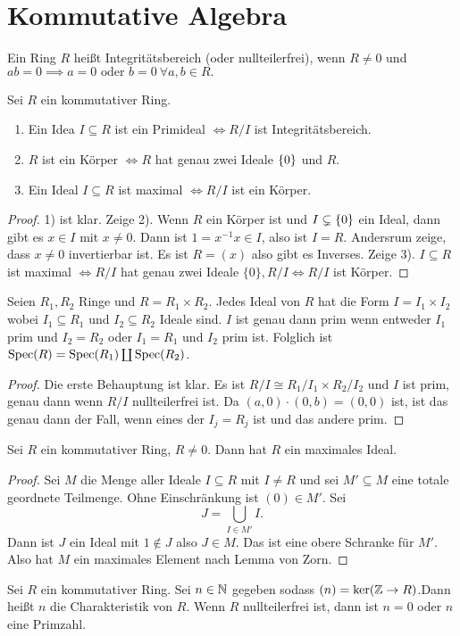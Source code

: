\section{Kommutative Algebra}

\begin{Def}
    Ein Ring $R$ heißt Integritätsbereich (oder nullteilerfrei), wenn $R\neq 0$ und $ab=0\implies a=0 \text{ oder } b=0 \ \forall a,b\in R.$
\end{Def}
\begin{Lemma} Sei $R$ ein kommutativer Ring.
\begin{enumerate}
    \item Ein Idea $I\subseteq R$ ist ein Primideal $\iff R/I$ ist Integritätsbereich.
    \item $R$ ist ein Körper $\iff R$ hat genau zwei Ideale $\{0\}$ und $R$.
    \item Ein Ideal $I\subseteq R$ ist maximal $\iff R/I$ ist ein Körper.
\end{enumerate}
\begin{proof}
    1) ist klar.
    Zeige 2). Wenn $R$ ein Körper ist und $I\subsetneq \{0\}$ ein Ideal, dann gibt es $x\in I$ mit $x\neq 0$. Dann ist $1=x^{-1}x\in I$, also ist $I=R$. Andersrum zeige, dass $x\neq 0$ invertierbar ist. Es ist $R=(x)$ also gibt es Inverses.
    Zeige 3). $I\subseteq R$ ist maximal $\iff R/I$ hat genau zwei Ideale $\{0\}, R/I \iff R/I$ ist Körper.
\end{proof}
\begin{Lemma}
    Seien $R_1,R_2$ Ringe und $R=R_1\times R_2$. Jedes Ideal von $R$ hat die Form $I=I_1\times I_2$ wobei $I_1\subseteq R_1$ und $I_2\subseteq R_2$ Ideale sind. $I$ ist genau dann prim wenn entweder $I_1$ prim und $I_2=R_2$ oder $I_1=R_1$ und $I_2$ prim ist.
    Folglich ist $\operatorname{Spec}(R)=\operatorname{Spec}(R_1)\coprod \operatorname{Spec}(R_2)$.
\end{Lemma}
\begin{proof}
    Die erste Behauptung ist klar. Es ist $R/I\cong R_1/I_1\times R_2/I_2$ und $I$ ist prim, genau dann wenn $R/I$ nullteilerfrei ist.
    Da $(a,0)\cdot (0,b)=(0,0)$ ist, ist das genau dann der Fall, wenn eines der $I_j=R_j$ ist und das andere prim.
\end{proof}

\begin{Satz}\label{Satz:ExMaxId}
    Sei $R$ ein kommutativer Ring, $R\neq 0$. Dann hat $R$ ein maximales Ideal.
\end{Satz}
\begin{proof}
    Sei $M$ die Menge aller Ideale $I\subseteq R$ mit $I\neq R$ und sei $M'\subseteq M$ eine totale geordnete Teilmenge.  Ohne Einschränkung ist $(0)\in M'$. Sei $$J=\bigcup\limits_{I\in M'}I.$$ Dann ist $J$ ein Ideal mit $1\not\in J$ also $J\in M$. Das ist eine obere Schranke für $M'$. Also hat $M$ ein maximales Element nach Lemma von Zorn.
\end{proof}
\end{Lemma}
\begin{Def}
    Sei $R$ ein kommutativer Ring. Sei $n\in \mathbb{N}$ gegeben sodass $(n)=\ker(\mathbb{Z}\to R)$.Dann heißt $n$ die Charakteristik von $R$. Wenn $R$ nullteilerfrei ist, dann ist $n=0$ oder $n$ eine Primzahl.
\end{Def}
